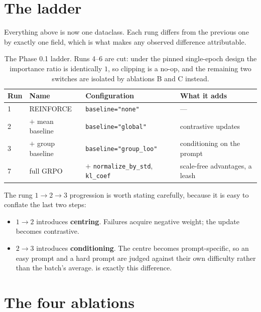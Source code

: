 \documentclass[11pt,letterpaper]{article}
\theoremstyle{definition}
\begin{document}
\section{The ladder}
\label{sec:ladder}

Everything above is now one dataclass. Each rung differs from the previous one by exactly one field,
which is what makes any observed difference attributable.

\begin{table}[H]
\centering
\caption{The Phase 0.1 ladder. Runs 4--6 are cut: under the pinned single-epoch design the importance
ratio is identically $1$, so clipping is a no-op, and the remaining two switches are isolated by
ablations B and C instead.}
\label{tab:ladder}
\small
\begin{tabular}{@{}llll@{}}
\toprule
\textbf{Run} & \textbf{Name} & \textbf{Configuration} & \textbf{What it adds} \\
\midrule
1 & REINFORCE           & \texttt{baseline="none"}       & --- \\
2 & $+$ mean baseline   & \texttt{baseline="global"}     & contrastive updates \\
3 & $+$ group baseline  & \texttt{baseline="group\_loo"} & conditioning on the prompt \\
7 & full GRPO           & $+$ \texttt{normalize\_by\_std}, \texttt{kl\_coef} & scale-free advantages, a leash \\
\bottomrule
\end{tabular}
\end{table}

The rung $1 \to 2 \to 3$ progression is worth stating carefully, because it is easy to conflate the
last two steps:

\begin{itemize}
  \item $1 \to 2$ introduces \textbf{centring}. Failures acquire negative weight; the update becomes
        contrastive.
  \item $2 \to 3$ introduces \textbf{conditioning}. The centre becomes prompt-specific, so an easy
        prompt and a hard prompt are judged against their own difficulty rather than the batch's
        average.  is exactly this difference.
\end{itemize}

\section{The four ablations}
\label{sec:ablations}
\end{document}
